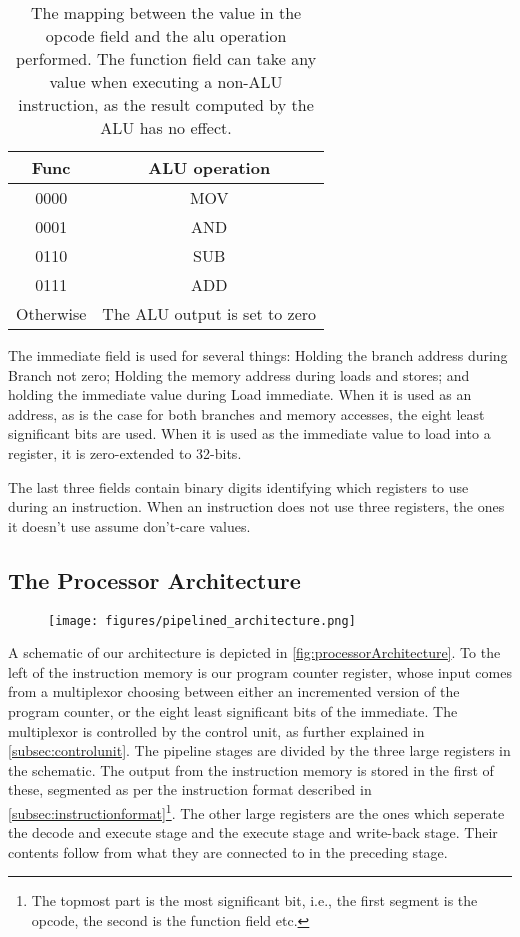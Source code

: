 \documentclass[11pt]{article}
\makeatletter
\newcommand{\etc}{etc.\@\xspace} \newcommand{\ie}{i.e.,\xspace}
\makeatother
\begin{document}
\begin{table}[htbp]
  \centering
  \begin{tabular}{|c|c|}
    \hline
    {\bf Func} & {\bf ALU operation} \\ \hline
    0000 & MOV \\ \hline
    0001 & AND \\ \hline
    0110 & SUB \\ \hline
    0111 & ADD \\ \hline
    Otherwise & The ALU output is set to zero \\ \hline
  \end{tabular}
  \caption{The mapping between the value in the opcode field and the alu operation performed. The function field can take any value when executing a non-ALU instruction, as the result computed by the ALU has no effect.}
  \label{tab:funcOperationMapping}
\end{table}

The immediate field is used for several things: Holding the branch
address during Branch not zero; Holding the memory address during
loads and stores; and holding the immediate value during Load
immediate. When it is used as an address, as is the case for both
branches and memory accesses, the eight least significant bits are
used. When it is used as the immediate value to load into a register,
it is zero-extended to 32-bits.

The last three fields contain binary digits identifying which
registers to use during an instruction. When an instruction does not
use three registers, the ones it doesn't use assume don't-care values. 

\subsection{The Processor Architecture}
\label{subsec:processor} 

\begin{figure}[ht]
  \centering
  \texttt{[image: figures/pipelined\_architecture.png]}
  \caption{\label{fig:processorArchitecture} }
\end{figure}

A schematic of our architecture is depicted in
\autoref{fig:processorArchitecture}. To the left of the instruction
memory is our program counter register, whose input comes from a
multiplexor choosing between either an incremented version of the
program counter, or the eight least significant bits of the
immediate. The multiplexor is controlled by the control unit, as
further explained in \autoref{subsec:controlunit}. The pipeline stages
are divided by the three large registers in the schematic. The output
from the instruction memory is stored in the first of these, segmented
as per the instruction format described in
\autoref{subsec:instructionformat}\footnote{The topmost part is the
  most significant bit, {\ie} the first segment is the opcode, the
  second is the function field {\etc}}. The other large registers are
the ones which seperate the decode and execute stage and the execute
stage and write-back stage. Their contents follow from what they are
connected to in the preceding stage. 
\end{document}
